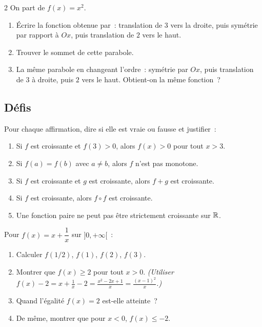 \begin{probleme}{2}
On part de $f(x)=x^2$.
\begin{enumerate}
  \item \'Ecrire la fonction obtenue par~:
        translation de $3$ vers la droite, puis sym\'etrie par rapport \`a $Ox$,
        puis translation de $2$ vers le haut.
  \item Trouver le sommet de cette parabole.
  \item La m\^eme parabole en changeant l'ordre~:
        sym\'etrie par $Ox$, puis translation de $3$ \`a droite, puis $2$ vers le haut.
        Obtient-on la m\^eme fonction~?
\end{enumerate}
\end{probleme}

\subsection*{D\'efis}

\begin{challenge}
Pour chaque affirmation, dire si elle est vraie ou fausse et justifier~:
\begin{enumerate}
  \item \og Si $f$ est croissante et $f(3)>0$, alors $f(x)>0$ pour tout $x>3$.\fg
  \item \og Si $f(a)=f(b)$ avec $a\ne b$, alors $f$ n'est pas monotone.\fg
  \item \og Si $f$ est croissante et $g$ est croissante, alors $f+g$ est croissante.\fg
  \item \og Si $f$ est croissante, alors $f\circ f$ est croissante.\fg
  \item \og Une fonction paire ne peut pas \^etre strictement croissante sur $\mathbb{R}$.\fg
\end{enumerate}
\end{challenge}

\begin{challenge}[Minimum de $f(x)=x+1/x$]
Pour $f(x)=x+\dfrac{1}{x}$ sur $]0,+\infty[$~:
\begin{enumerate}
  \item Calculer $f(1/2)$, $f(1)$, $f(2)$, $f(3)$.
  \item Montrer que $f(x)\geq2$ pour tout $x>0$.
        \emph{(Utiliser $f(x)-2=x+\frac{1}{x}-2=\frac{x^2-2x+1}{x}=\frac{(x-1)^2}{x}$.)}
  \item Quand l'\'egalit\'e $f(x)=2$ est-elle atteinte~?
  \item De m\^eme, montrer que pour $x<0$, $f(x)\leq-2$.
\end{enumerate}
\end{challenge}

